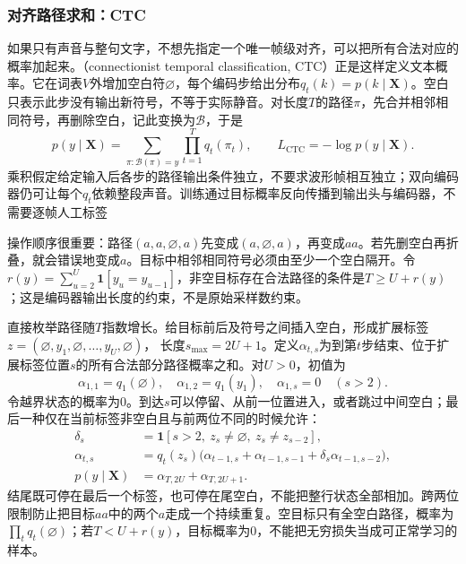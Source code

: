 \subsubsection{对齐路径求和：CTC}
\label{sec:nlp-speech-ctc}

如果只有声音与整句文字，不想先指定一个唯一帧级对齐，可以把所有合法对应的概率加起来。（connectionist temporal classification, CTC）正是这样定义文本概率。它在词表$V$外增加空白符$\varnothing$，每个编码步给出分布$q_t(k)=p(k\mid\bm{X})$。空白只表示此步没有输出新符号，不等于实际静音。对长度$T$的路径$\pi$，先合并相邻相同符号，再删除空白，记此变换为$\mathcal{B}$，于是
\begin{equation}
 p(y\mid\bm{X})=
 \sum_{\pi:\mathcal{B}(\pi)=y}\prod_{t=1}^{T}q_t(\pi_t),
 \qquad L_{\mathrm{CTC}}=-\log p(y\mid\bm{X}).
 \label{eq:nlp-speech-ctc-probability}
\end{equation}
乘积假定给定输入后各步的路径输出条件独立，不要求波形帧相互独立；双向编码器仍可让每个$q_t$依赖整段声音。训练通过目标概率反向传播到输出头与编码器，不需要逐帧人工标签

操作顺序很重要：路径$(a,a,\varnothing,a)$先变成$(a,\varnothing,a)$，再变成$aa$。若先删空白再折叠，就会错误地变成$a$。目标中相邻相同符号必须由至少一个空白隔开。令$r(y)=\sum_{u=2}^{U}\mathbf{1}[y_u=y_{u-1}]$，非空目标存在合法路径的条件是$T\geq U+r(y)$；这是编码器输出长度的约束，不是原始采样数约束。

直接枚举路径随$T$指数增长。给目标前后及符号之间插入空白，形成扩展标签
$z=(\varnothing,y_1,\varnothing,\ldots,y_U,\varnothing)$，
长度$s_{\max}=2U+1$。定义$\alpha_{t,s}$为到第$t$步结束、位于扩展标签位置$s$的所有合法部分路径概率之和。对$U>0$，初值为
\begin{equation}
 \alpha_{1,1}=q_1(\varnothing),\quad
 \alpha_{1,2}=q_1(y_1),\quad
 \alpha_{1,s}=0\quad(s>2).
 \label{eq:nlp-speech-ctc-initial}
\end{equation}
令越界状态的概率为0。到达$s$可以停留、从前一位置进入，或者跳过中间空白；最后一种仅在当前标签非空白且与前两位不同的时候允许：
\begin{equation}
\begin{aligned}
 \delta_s&=\mathbf{1}[s>2,\ z_s\ne\varnothing,\ z_s\ne z_{s-2}],\\
 \alpha_{t,s}
 &=q_t(z_s)\bigl(\alpha_{t-1,s}+\alpha_{t-1,s-1}
                    +\delta_s\alpha_{t-1,s-2}\bigr),\\
 p(y\mid\bm{X})&=\alpha_{T,2U}+\alpha_{T,2U+1}.
\end{aligned}
\label{eq:nlp-speech-ctc-forward}
\end{equation}
结尾既可停在最后一个标签，也可停在尾空白，不能把整行状态全部相加。跨两位限制防止把目标$aa$中的两个$a$走成一个持续重复。空目标只有全空白路径，概率为$\prod_tq_t(\varnothing)$；若$T<U+r(y)$，目标概率为0，不能把无穷损失当成可正常学习的样本。

